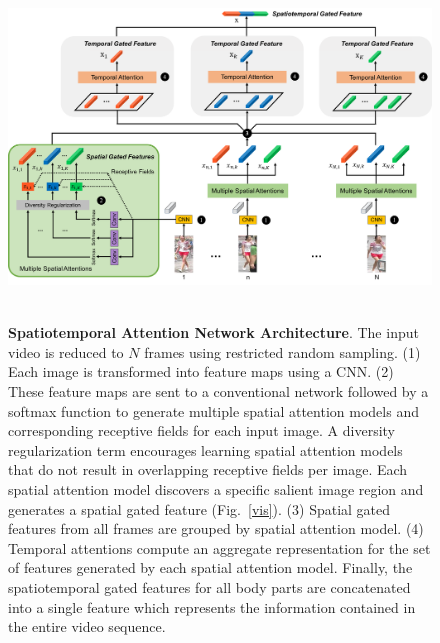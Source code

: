 \begin{figure}[t]
	\begin{center}
		\includegraphics[width=1.0\linewidth]{figures/person_reid/ls2.pdf} \ \\
	\end{center}
	\vspace{-3mm}
	\caption{\textbf{Spatiotemporal Attention Network Architecture}. The input video is reduced to $N$ frames using restricted random sampling. (1) Each image is transformed into feature maps using a CNN. (2) These feature maps are sent to a conventional network followed by a softmax function to generate multiple spatial attention models and corresponding receptive fields for each input image.  A diversity regularization term encourages learning spatial attention models that do not result in overlapping receptive fields per image. Each spatial attention model discovers a specific salient image region and generates a spatial gated feature (Fig.~\ref{vis}). (3) Spatial gated features from all frames are grouped by spatial attention model. (4) Temporal attentions compute an aggregate representation for the set of features generated by each spatial attention model. Finally, the spatiotemporal gated features for all body parts are concatenated into a single feature which represents the information contained in the entire video sequence. }
	\label{net2}
\end{figure}



